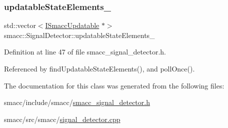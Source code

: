 \subsubsection{\texorpdfstring{updatable\+State\+Elements\+\_\+}{updatableStateElements\_}}
{\footnotesize\ttfamily std\+::vector$<$\hyperlink{classsmacc_1_1ISmaccUpdatable}{I\+Smacc\+Updatable} $\ast$$>$ smacc\+::\+Signal\+Detector\+::updatable\+State\+Elements\+\_\+\hspace{0.3cm}{\ttfamily [private]}}



Definition at line 47 of file smacc\+\_\+signal\+\_\+detector.\+h.



Referenced by find\+Updatable\+State\+Elements(), and poll\+Once().



The documentation for this class was generated from the following files\+:\begin{DoxyCompactItemize}
\item 
smacc/include/smacc/\hyperlink{smacc__signal__detector_8h}{smacc\+\_\+signal\+\_\+detector.\+h}\item 
smacc/src/smacc/\hyperlink{signal__detector_8cpp}{signal\+\_\+detector.\+cpp}\end{DoxyCompactItemize}
